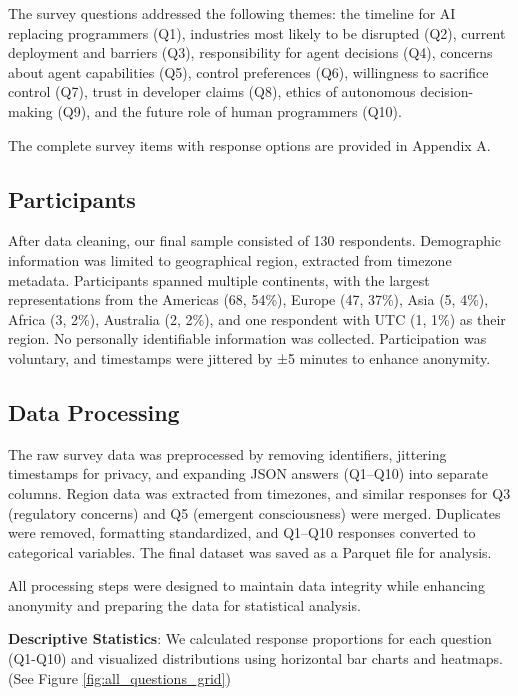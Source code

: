 \documentclass{article}
\begin{document}
The survey questions addressed the following themes: the timeline for AI replacing programmers (Q1), industries most likely to be disrupted (Q2), current deployment and barriers (Q3), responsibility for agent decisions (Q4), concerns about agent capabilities (Q5), control preferences (Q6), willingness to sacrifice control (Q7), trust in developer claims (Q8), ethics of autonomous decision-making (Q9), and the future role of human programmers (Q10).

The complete survey items with response options are provided in Appendix
A.

\subsection{Participants}\label{participants}

After data cleaning, our final sample consisted of 130 respondents.
Demographic information was limited to geographical region, extracted
from timezone metadata. Participants spanned multiple continents, with
the largest representations from the Americas (68, 54\%), Europe (47,
37\%), Asia (5, 4\%), Africa (3, 2\%), Australia (2, 2\%), and one
respondent with UTC (1, 1\%) as their region. No personally identifiable
information was collected. Participation was voluntary,
and timestamps were jittered by ±5 minutes to enhance anonymity.

\subsection{Data Processing}\label{data-processing}

The raw survey data was preprocessed by removing identifiers, jittering timestamps for privacy, and expanding JSON answers (Q1–Q10) into separate columns. Region data was extracted from timezones, and similar responses for Q3 (regulatory concerns) and Q5 (emergent consciousness) were merged. Duplicates were removed, formatting standardized, and Q1–Q10 responses converted to categorical variables. The final dataset was saved as a Parquet file for analysis.

All processing steps were designed to maintain data integrity while
enhancing anonymity and preparing the data for statistical analysis.

\textbf{Descriptive Statistics}: We calculated response proportions for
each question (Q1-Q10) and visualized distributions using horizontal bar
charts and heatmaps. (See Figure \ref{fig:all_questions_grid})
\end{document}
